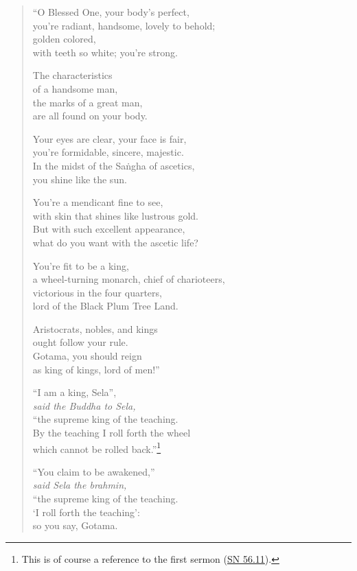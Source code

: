 \documentclass[12pt,openany]{book}%
\newcommand*{\scspeaker}[1]{\hspace{2em}\textit{#1}}
\begin{document}
\begin{verse}%
“O Blessed One, your body’s perfect, \\
you’re radiant, handsome, lovely to behold; \\
golden colored, \\
with teeth so white; you’re strong. 

The characteristics \\
of a handsome man, \\
the marks of a great man, \\
are all found on your body. 

Your eyes are clear, your face is fair, \\
you’re formidable, sincere, majestic. \\
In the midst of the \textsanskrit{Saṅgha} of ascetics, \\
you shine like the sun. 

You’re a mendicant fine to see, \\
with skin that shines like lustrous gold. \\
But with such excellent appearance, \\
what do you want with the ascetic life? 

You’re fit to be a king, \\
a wheel-turning monarch, chief of charioteers, \\
victorious in the four quarters, \\
lord of the Black Plum Tree Land. 

Aristocrats, nobles, and kings \\
ought follow your rule. \\
Gotama, you should reign \\
as king of kings, lord of men!” 

“I am a king, Sela”, \\
\scspeaker{said the Buddha to Sela, }\\
“the supreme king of the teaching. \\
By the teaching I roll forth the wheel \\
which cannot be rolled back.”\footnote{This is of course a reference to the first sermon (\href{https://suttacentral.net/sn56.11/en/sujato}{SN 56.11}). } 

“You claim to be awakened,” \\
\scspeaker{said Sela the brahmin, }\\
“the supreme king of the teaching. \\
‘I roll forth the teaching’: \\
so you say, Gotama. 


\end{verse}
\end{document}
